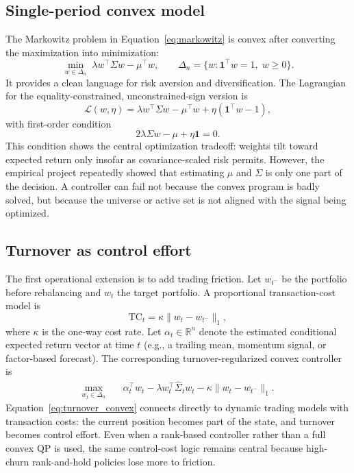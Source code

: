 \documentclass[journal,10pt]{IEEEtran}
\newcommand{\R}{\mathbb{R}}
\newcommand{\one}{\mathbf{1}}
\begin{document}
\subsection{Single-period convex model}
The Markowitz problem in Equation~\eqref{eq:markowitz} is convex after converting the maximization into minimization:
\begin{equation}
\min_{w\in\Delta_n}\; \lambda w^\top \Sigma w - \mu^\top w, \qquad \Delta_n=\{w:\one^\top w=1,\; w\ge0\}.
\end{equation}
It provides a clean language for risk aversion and diversification. The Lagrangian for the equality-constrained, unconstrained-sign version is
\begin{equation}
\mathcal{L}(w,\eta)=\lambda w^\top\Sigma w-\mu^\top w + \eta(\one^\top w-1),
\end{equation}
with first-order condition
\begin{equation}
2\lambda \Sigma w - \mu + \eta\one =0.
\end{equation}
This condition shows the central optimization tradeoff: weights tilt toward expected return only insofar as covariance-scaled risk permits. However, the empirical project repeatedly showed that estimating $\mu$ and $\Sigma$ is only one part of the decision. A controller can fail not because the convex program is badly solved, but because the universe or active set is not aligned with the signal being optimized.

\subsection{Turnover as control effort}
The first operational extension is to add trading friction. Let $w_{t^-}$ be the portfolio before rebalancing and $w_t$ the target portfolio. A proportional transaction-cost model is
\begin{equation}
\text{TC}_t = \kappa \lVert w_t-w_{t^-}\rVert_1,
\end{equation}
where $\kappa$ is the one-way cost rate. Let $\alpha_t\in\R^n$ denote the estimated conditional expected return vector at time $t$ (e.g., a trailing mean, momentum signal, or factor-based forecast). The corresponding turnover-regularized convex controller is
\begin{equation}
\begin{aligned}
\max_{w_t\in\Delta_n}\quad & \alpha_t^\top w_t - \lambda w_t^\top\widehat{\Sigma}_t w_t - \kappa\lVert w_t-w_{t^-}\rVert_1.
\end{aligned}
\label{eq:turnover_convex}
\end{equation}
Equation~\eqref{eq:turnover_convex} connects directly to dynamic trading models with transaction costs: the current position becomes part of the state, and turnover becomes control effort. Even when a rank-based controller rather than a full convex QP is used, the same control-cost logic remains central because high-churn rank-and-hold policies lose more to friction.
\end{document}
